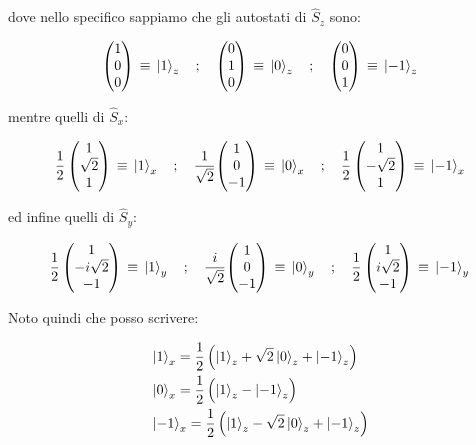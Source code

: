 	dove nello specifico sappiamo che gli autostati di $\hat{S}_z$ sono:
	
\begin{align*}
	\mqty( 1  \\ 0  \\ 0 ) \, \equiv \, \ket{1}_z  \quad ; \quad \mqty( 0  \\ 1  \\ 0 ) \, \equiv \, \ket{0}_z  \quad ; \quad \mqty( 0  \\ 0  \\ 1 ) \, \equiv \, \ket{-1}_z
\end{align*}

	mentre quelli di $\hat{S}_x$:

\begin{align*}
	\frac{1}{2} \, \mqty( 1  \\ \sqrt{2}  \\ 1 ) \, \equiv \, \ket{1}_x  \quad ; \quad \frac{1}{\sqrt{2}}\mqty( 1  \\ 0  \\ -1 ) \, \equiv \, \ket{0}_x  \quad ; \quad \frac{1}{2} \,\mqty( 1  \\ -\sqrt{2}  \\ 1 ) \, \equiv \, \ket{-1}_x
\end{align*}
	
	ed infine quelli di $\hat{S}_y$:
	
\begin{align*}
	\frac{1}{2} \, \mqty( 1  \\ -i \sqrt{2}  \\ -1 ) \, \equiv \, \ket{1}_y  \quad ; \quad \frac{i}{\sqrt{2}}\mqty( 1  \\ 0  \\ -1 ) \, \equiv \, \ket{0}_y  \quad ; \quad \frac{1}{2} \, \mqty( 1  \\ i\sqrt{2}  \\ -1 ) \, \equiv \, \ket{-1}_y
\end{align*}

	Noto quindi che posso scrivere:
	
\begin{align*}
	& \ket{1}_x = \frac{1}{2} \, \qty\Big(\ket{1}_z + \sqrt{2} \ket{0}_z + \ket{-1}_z) \\
	& \ket{0}_x = \frac{1}{2} \, \qty\Big(\ket{1}_z - \ket{-1}_z) \\
	& \ket{-1}_x = \frac{1}{2} \, \qty\Big(\ket{1}_z - \sqrt{2} \ket{0}_z + \ket{-1}_z)
\end{align*}

